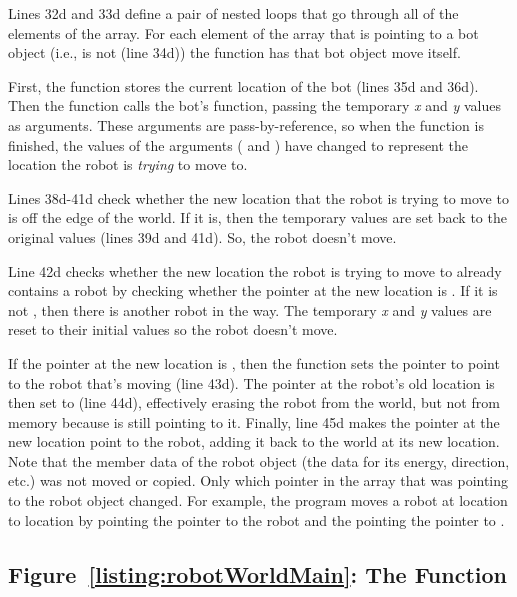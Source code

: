 Lines 32d and 33d define a pair of nested  loops that go through all of the elements of the  array.  For each element of the array that is pointing to a bot object (i.e., is not  (line 34d)) the function has that bot object move itself.  

First, the function stores the current location of the bot (lines 35d and 36d).  Then the function calls the bot's  function, passing the temporary \emph{x} and \emph{y} values as arguments.  These arguments are pass-by-reference, so when the  function is finished, the values of the arguments ( and ) have changed to represent the location the robot is \emph{trying} to move to. 

Lines 38d-41d check whether the new location that the robot is trying to move to is off the edge of the world.  If it is, then the temporary values are set back to the original values (lines 39d and 41d).  So, the robot doesn't move.  

Line 42d checks whether the new location the robot is trying to move to already contains a robot by checking whether the pointer at the new location is .  If it is not , then there is another robot in the way.  The temporary \emph{x} and \emph{y} values are reset to their initial values so the robot doesn't move.

If the pointer at the new location is , then the function sets the pointer  to point to the robot that's moving (line 43d).  The pointer at the robot's old location is then set to  (line 44d), effectively erasing the robot from the world, but not from memory because  is still pointing to it. Finally, line 45d makes the pointer at the new location point to the robot, adding it back to the world at its new location.  Note that the member data of the robot object (the data for its energy, direction, etc.) was not moved or copied.  Only which pointer in the  array that was pointing to the robot object changed.  
For example, the program moves a robot at location  to location  by pointing the  pointer to the robot and the pointing the  pointer to .

\subsection{Figure~\ref{listing:robotWorldMain}: The  Function}

